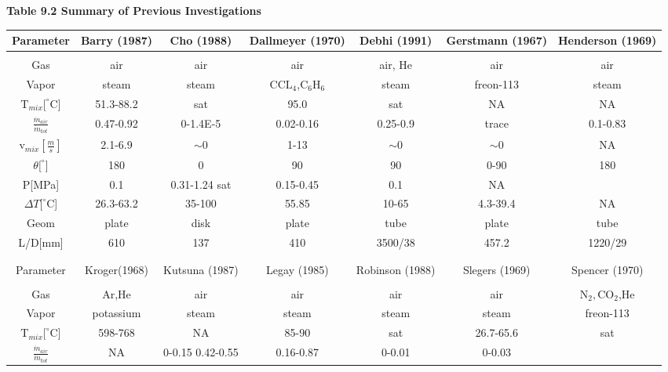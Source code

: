 \documentclass[12pt,fleqn]{report}
\begin{document}
{\newpage
\clearpage
\samepage \begin{sidewaystable}[hp]
\begin{minipage}{9.0in}

\hspace{2.5mm}
{\bf Table 9.2 Summary of Previous Investigations}
\begin{center}

\begin{tabular}{*{7}{c}}
Parameter & Barry (1987) & Cho (1988) & Dallmeyer (1970) & Debhi (1991) & Gerstmann (1967) & Henderson (1969)\\  \hline
& & & & & & \\ 
Gas & air & air & air & air, He & air & air\\ 
Vapor & steam & steam & CC$\mbox{L}_{4}$,$\mbox{C}_{6} \mbox{H}_{6}$ & steam & freon-113 & steam\\ 
$\mbox{T}_{mix}[^{\circ}$C] & 51.3-88.2 & sat & 95.0 & sat & NA & NA\\  [2mm]
$\frac{\dot{m}_{air}}{\dot{m}_{tot}}$ & 0.47-0.92 & 0-1.4E-5 & 0.02-0.16 & 0.25-0.9 & trace & 0.1-0.83\\  [2mm]
$\mbox{v}_{mix} \left[ \frac{m}{s} \right]$ & 2.1-6.9 & $\sim$0 & 1-13 & $\sim$0 & $\sim$0 & NA\\ 
$\theta [^{\circ}$] & 180 & 0 & 90 & 90 & 0-90 & 180\\ 
P[MPa] & 0.1 & 0.31-1.24 sat & 0.15-0.45 & 0.1 & NA\\ 
$\Delta T[^{\circ}$C] & 26.3-63.2 & 35-100 & 55.85 & 10-65 & 4.3-39.4 & NA\\ 
Geom & plate & disk & plate & tube & plate & tube \\ 
L/D[mm] & 610 & 137 & 410 & 3500/38 & 457.2 & 1220/29\\  [4mm] \hline
& & & & & & \\  \hline
& & & & & &  \\ 
Parameter & Kroger(1968) & Kutsuna (1987) & Legay (1985) & Robinson (1988) & Slegers (1969) & Spencer (1970)\\  \hline
& & & & & & \\ 
Gas & Ar,He & air & air & air & air & $\mbox{N}_{2},\mbox{CO}_{2}$,He\\ 
Vapor & potassium & steam & steam & steam & steam & freon-113\\ 
$\mbox{T}_{mix}[^{\circ}$C] & 598-768 & NA & 85-90 & sat & 26.7-65.6 & sat\\  [2mm]
$\frac{\dot{m}_{air}}{\dot{m}_{tot}}$ & NA & 0-0.15 0.42-0.55 & 0.16-0.87 & 0-0.01 & 0-0.03 & \\  [2mm]

\end{tabular}
\end{center}
\end{minipage}
\end{sidewaystable}}
\end{document}

